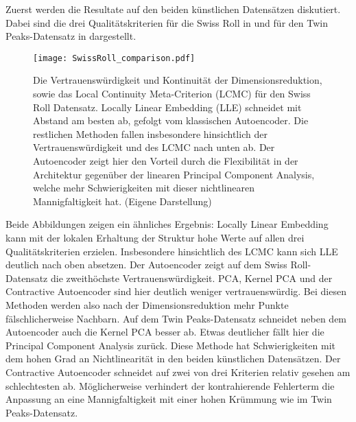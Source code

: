 Zuerst werden die Resultate auf den beiden künstlichen Datensätzen diskutiert. Dabei sind die drei
Qualitätskriterien für die Swiss Roll in  und für den Twin
Peaks-Datensatz in  dargestellt.
\begin{figure}[ht]
	\begin{center}
		\texttt{[image: SwissRoll\_comparison.pdf]}
	\end{center}
	\caption[Qualitätskriterien für den Swiss Roll-Datensatz]{Die Vertrauenswürdigkeit und Kontinuität der Dimensionsreduktion, sowie das Local Continuity Meta-Criterion (LCMC) für den Swiss Roll Datensatz. Locally Linear Embedding (LLE) schneidet mit Abstand am besten ab, gefolgt vom klassischen Autoencoder. Die restlichen Methoden fallen insbesondere hinsichtlich der Vertrauenswürdigkeit und des LCMC nach unten ab. Der Autoencoder zeigt hier den Vorteil durch die Flexibilität in der Architektur gegenüber der linearen Principal Component Analysis, welche mehr Schwierigkeiten mit dieser nichtlinearen Mannigfaltigkeit hat. (Eigene Darstellung)}
	\label{fig:SwissRollMetrics}
\end{figure}
Beide Abbildungen zeigen ein ähnliches Ergebnis: Locally Linear Embedding kann mit der lokalen Erhaltung der Struktur hohe Werte auf allen drei Qualitätskriterien erzielen. Insbesondere hinsichtlich des LCMC kann sich LLE deutlich nach oben absetzen.
Der Autoencoder zeigt auf dem Swiss Roll-Datensatz die zweithöchste Vertrauenswürdigkeit. PCA, Kernel PCA und der Contractive Autoencoder sind hier deutlich weniger vertrauenswürdig. Bei diesen Methoden werden also nach der Dimensionsreduktion mehr Punkte fälschlicherweise Nachbarn. Auf dem Twin Peaks-Datensatz schneidet neben dem Autoencoder auch die Kernel PCA besser ab. Etwas deutlicher fällt hier die Principal Component Analysis zurück. Diese Methode hat Schwierigkeiten mit dem hohen Grad an Nichtlinearität in den beiden künstlichen Datensätzen. Der Contractive Autoencoder schneidet auf zwei von drei Kriterien relativ gesehen am schlechtesten ab. Möglicherweise verhindert der kontrahierende Fehlerterm die Anpassung an eine Mannigfaltigkeit mit einer hohen Krümmung wie im Twin Peaks-Datensatz.

